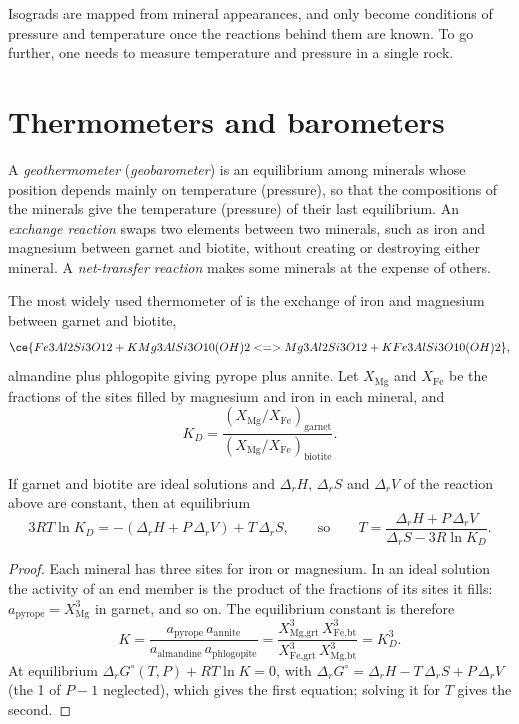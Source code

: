 Isograds are mapped from mineral appearances, and only become conditions of pressure and
temperature once the reactions behind them are known. To go further, one needs to measure
temperature and pressure in a single rock.

\section{Thermometers and barometers}\label{sec:b2:pt-paths:thermobarometry}

\begin{definition}\label{def:b2:pt-paths:thermobarometry}
A \emph{geothermometer} (\emph{geobarometer}) is
an equilibrium among minerals whose position depends mainly on temperature (pressure), so
that the compositions of the minerals give the temperature (pressure) of their last
equilibrium. An \emph{exchange reaction} swaps two elements
between two minerals, such as iron and magnesium between garnet and biotite, without
creating or destroying either mineral. A \emph{net-transfer reaction} makes some minerals at the expense of others.
\end{definition}

The most widely used thermometer of  is the exchange of iron and magnesium
between garnet and biotite,
\[
\ce{Fe3Al2Si3O12 + KMg3AlSi3O10(OH)2 <=> Mg3Al2Si3O12 + KFe3AlSi3O10(OH)2},
\]
almandine plus phlogopite giving pyrope plus annite. Let $X_{\text{Mg}}$ and $X_{\text{Fe}}$
be the fractions of the sites filled by magnesium and iron in each mineral, and
\[
K_D = \frac{(X_{\text{Mg}}/X_{\text{Fe}})_{\text{garnet}}}{(X_{\text{Mg}}/X_{\text{Fe}})_{\text{biotite}}}.
\]

\begin{proposition}\label{prop:b2:pt-paths:exchange}
If garnet and biotite are ideal solutions and $\Delta_r H$, $\Delta_r S$ and $\Delta_r V$ of
the reaction above are constant, then at equilibrium
\[
3RT\ln K_D = -(\Delta_r H + P\,\Delta_r V) + T\,\Delta_r S,
\qquad\text{so}\qquad
T = \frac{\Delta_r H + P\,\Delta_r V}{\Delta_r S - 3R\ln K_D}.
\]
\end{proposition}

\begin{proof}
Each mineral has three sites for iron or magnesium. In an ideal solution the activity of
an end member is the product of the fractions of its sites it fills: $a_{\text{pyrope}} =
X_{\text{Mg}}^3$ in garnet, and so on. The equilibrium constant is therefore
\[
K = \frac{a_{\text{pyrope}}\,a_{\text{annite}}}{a_{\text{almandine}}\,a_{\text{phlogopite}}}
= \frac{X_{\text{Mg,grt}}^3\,X_{\text{Fe,bt}}^3}{X_{\text{Fe,grt}}^3\,X_{\text{Mg,bt}}^3} = K_D^3 .
\]
At equilibrium $\Delta_r G^\circ(T, P) + RT\ln K = 0$, with $\Delta_r G^\circ = \Delta_r H -
T\,\Delta_r S + P\,\Delta_r V$ (the 1 of $P - 1$ neglected), which gives the first equation;
solving it for $T$ gives the second.
\end{proof}


